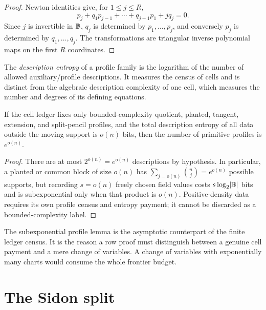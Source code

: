 \documentclass[11pt,a4paper]{amsart}
\numberwithin{equation}{section}
\theoremstyle{remark}
\begin{document}
\begin{proof}
Newton identities give, for \(1\le j\le R\),
\[
        p_j+q_1p_{j-1}+\cdots+q_{j-1}p_1+jq_j=0.
\]
Since \(j\) is invertible in \(\mathbb B\), \(q_j\) is determined by \(p_1,\ldots,p_j\), and conversely \(p_j\) is determined by \(q_1,\ldots,q_j\).  The transformations are triangular inverse polynomial maps on the first \(R\) coordinates.
\end{proof}

The \emph{description entropy} of a profile family is the logarithm of the
number of allowed auxiliary/profile descriptions.  It measures the census
of cells and is distinct from the algebraic description complexity of one
cell, which measures the number and degrees of its defining equations.

\begin{lemma}\label{lem:profile-multiplicity}
If the cell ledger fixes only bounded-complexity quotient, planted, tangent,
extension, and split-pencil profiles, and the total description entropy of
all data outside the moving support is \(o(n)\) bits, then the number of
primitive profiles is \(e^{o(n)}\).
\end{lemma}

\begin{proof}
There are at most \(2^{o(n)}=e^{o(n)}\) descriptions by hypothesis.  In
particular, a planted or common block of size \(o(n)\) has
\(\sum_{j=o(n)}\binom nj=e^{o(n)}\) possible supports, but recording
\(s=o(n)\) freely chosen field values costs \(s\log_2\lvert \mathbb B\rvert\) bits and is
subexponential only when that product is \(o(n)\).  Positive-density data
requires its own profile census and entropy payment; it cannot be discarded
as a bounded-complexity label.
\end{proof}

\begin{remark}
The subexponential profile lemma is the asymptotic counterpart of the
finite ledger census.  It is the reason a row proof must distinguish
between a genuine cell payment and a mere change of variables.  A change
of variables with exponentially many charts would consume the whole
frontier budget.
\end{remark}

\section{The Sidon split}\label{sec:sidon-split}
\end{document}
